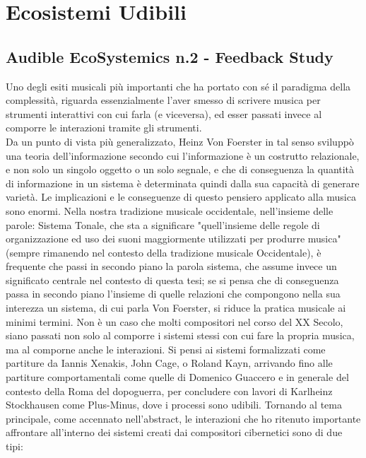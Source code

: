 \section{Ecosistemi Udibili}
\label{sec:Ecosistemi Udibili}

\subsection{Audible EcoSystemics n.2 - Feedback Study}
\label{sec:Audible EcoSystemics n.2 - Feedback Study}

Uno degli esiti musicali più importanti che ha portato con sé 
il paradigma della complessità, riguarda essenzialmente l'aver smesso di 
scrivere musica per strumenti interattivi con cui farla (e viceversa), 
ed esser passati invece al  comporre le interazioni tramite gli strumenti. \\
Da un punto di vista più generalizzato, Heinz Von Foerster in tal senso 
sviluppò una teoria dell'informazione secondo cui l'informazione è un costrutto relazionale, 
e non solo un singolo oggetto o un solo segnale, 
e che di conseguenza la quantità di informazione in un sistema è determinata 
quindi dalla sua capacità di generare varietà.
Le implicazioni e le conseguenze di questo pensiero applicato alla musica sono enormi.
Nella nostra tradizione musicale occidentale, nell'insieme delle parole: Sistema Tonale, 
che sta a significare "quell'insieme delle regole di organizzazione ed uso dei
suoni maggiormente utilizzati per produrre musica" 
(sempre rimanendo nel contesto della tradizione musicale Occidentale), 
è frequente che passi in secondo piano la parola 
sistema, che assume invece un significato centrale nel contesto di questa tesi;
se si pensa che di conseguenza passa in secondo piano l'insieme di quelle relazioni
che compongono nella sua interezza un sistema, di cui parla Von Foerster, 
si riduce la pratica musicale ai minimi termini.
Non è un caso che molti compositori nel corso del XX Secolo, siano passati non solo al comporre 
i sistemi stessi con cui fare la propria musica, ma al comporne anche le interazioni.
Si pensi ai sistemi formalizzati come partiture da Iannis Xenakis, John Cage, o Roland Kayn,
arrivando fino alle partiture comportamentali come quelle di Domenico Guaccero e 
in generale del contesto della Roma del dopoguerra, per concludere con lavori di 
Karlheinz Stockhausen come Plus-Minus, dove i processi sono udibili.
Tornando al tema principale, come accennato nell'abstract, 
le interazioni che ho ritenuto importante affrontare 
all'interno dei sistemi creati dai compositori cibernetici sono di due tipi:
